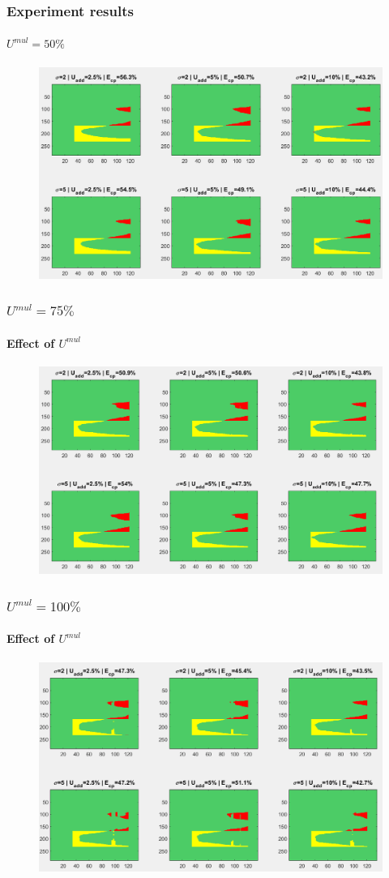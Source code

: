 \documentclass[fleqn]{beamer}
\begin{document}
\begin{frame}
	\frametitle{Experiment results}
	\framesubtitle{$U^{mul}=50\% $}
	\begin{figure}
		\centering
		\includegraphics[width=4.5in]{figures/results_figures/Umul/cp_Umul_50_lambda_11.png}
	\end{figure}
\end{frame}

\begin{frame}
	\frametitle{$U^{mul}=75\% $}
	\framesubtitle{Effect of $U^{mul}$}
	\begin{figure}
		\centering
		\includegraphics[width=4.5in]{figures/results_figures/Umul/cp_Umul_75_lambda_11.png}
	\end{figure}
\end{frame}

\begin{frame}
	\frametitle{$U^{mul}=100\% $}
	\framesubtitle{Effect of $U^{mul}$}
	\begin{figure}
		\centering
		\includegraphics[width=4.5in]{figures/results_figures/Umul/cp_Umul_100_lambda_11.png}
	\end{figure}
\end{frame}
\end{document}
